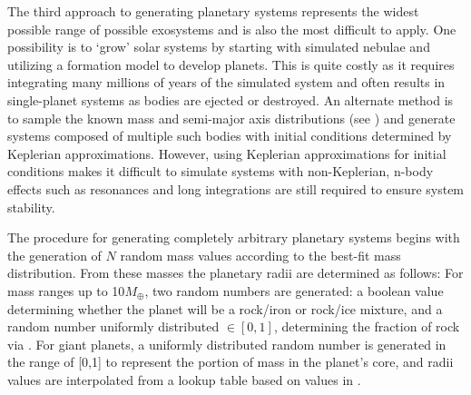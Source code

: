 The third approach to generating planetary systems represents the widest possible range of possible exosystems and is also the most difficult to apply.  One possibility is to `grow' solar systems by starting with simulated nebulae and utilizing a formation model to develop planets.  This is quite costly as it requires integrating many millions of years of the simulated system and often results in single-planet systems as bodies are ejected or destroyed.  An alternate method is to sample the known mass and semi-major axis distributions (see ) and generate systems composed of multiple such bodies with initial conditions determined by Keplerian approximations.   However, using Keplerian approximations for initial conditions makes it difficult to simulate systems with non-Keplerian, n-body effects such as resonances \citep{fabrycky2010non} and long integrations are still required to ensure system stability.

The procedure for generating completely arbitrary planetary systems begins with the generation of $N$ random mass values according to the best-fit mass distribution.  From these masses the planetary radii are determined as follows:  For mass ranges up to 10$M_\oplus$, two random numbers are generated: a boolean value determining whether the planet will be a rock/iron or rock/ice mixture, and a random number uniformly distributed $\in [0,1]$, determining the fraction of rock via .  For giant planets, a uniformly distributed random number is generated in the range of [0,1] to represent the portion of mass in the planet's core, and radii values are interpolated from a lookup table based on values in \citet{fortney2007}.
 
